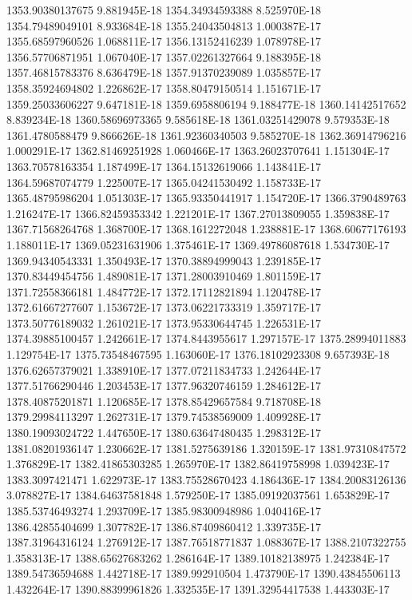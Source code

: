 1353.90380137675  9.881945E-18
1354.34934593388  8.525970E-18
1354.79489049101  8.933684E-18
1355.24043504813  1.000387E-17
1355.68597960526  1.068811E-17
1356.13152416239  1.078978E-17
1356.57706871951  1.067040E-17
1357.02261327664  9.188395E-18
1357.46815783376  8.636479E-18
1357.91370239089  1.035857E-17
1358.35924694802  1.226862E-17
1358.80479150514  1.151671E-17
1359.25033606227  9.647181E-18
1359.6958806194  9.188477E-18
1360.14142517652  8.839234E-18
1360.58696973365  9.585618E-18
1361.03251429078  9.579353E-18
1361.4780588479  9.866626E-18
1361.92360340503  9.585270E-18
1362.36914796216  1.000291E-17
1362.81469251928  1.060466E-17
1363.26023707641  1.151304E-17
1363.70578163354  1.187499E-17
1364.15132619066  1.143841E-17
1364.59687074779  1.225007E-17
1365.04241530492  1.158733E-17
1365.48795986204  1.051303E-17
1365.93350441917  1.154720E-17
1366.3790489763  1.216247E-17
1366.82459353342  1.221201E-17
1367.27013809055  1.359838E-17
1367.71568264768  1.368700E-17
1368.1612272048  1.238881E-17
1368.60677176193  1.188011E-17
1369.05231631906  1.375461E-17
1369.49786087618  1.534730E-17
1369.94340543331  1.350493E-17
1370.38894999043  1.239185E-17
1370.83449454756  1.489081E-17
1371.28003910469  1.801159E-17
1371.72558366181  1.484772E-17
1372.17112821894  1.120478E-17
1372.61667277607  1.153672E-17
1373.06221733319  1.359717E-17
1373.50776189032  1.261021E-17
1373.95330644745  1.226531E-17
1374.39885100457  1.242661E-17
1374.8443955617  1.297157E-17
1375.28994011883  1.129754E-17
1375.73548467595  1.163060E-17
1376.18102923308  9.657393E-18
1376.62657379021  1.338910E-17
1377.07211834733  1.242644E-17
1377.51766290446  1.203453E-17
1377.96320746159  1.284612E-17
1378.40875201871  1.120685E-17
1378.85429657584  9.718708E-18
1379.29984113297  1.262731E-17
1379.74538569009  1.409928E-17
1380.19093024722  1.447650E-17
1380.63647480435  1.298312E-17
1381.08201936147  1.230662E-17
1381.5275639186  1.320159E-17
1381.97310847572  1.376829E-17
1382.41865303285  1.265970E-17
1382.86419758998  1.039423E-17
1383.3097421471  1.622973E-17
1383.75528670423  4.186436E-17
1384.20083126136  3.078827E-17
1384.64637581848  1.579250E-17
1385.09192037561  1.653829E-17
1385.53746493274  1.293709E-17
1385.98300948986  1.040416E-17
1386.42855404699  1.307782E-17
1386.87409860412  1.339735E-17
1387.31964316124  1.276912E-17
1387.76518771837  1.088367E-17
1388.2107322755  1.358313E-17
1388.65627683262  1.286164E-17
1389.10182138975  1.242384E-17
1389.54736594688  1.442718E-17
1389.992910504  1.473790E-17
1390.43845506113  1.432264E-17
1390.88399961826  1.332535E-17
1391.32954417538  1.443303E-17
